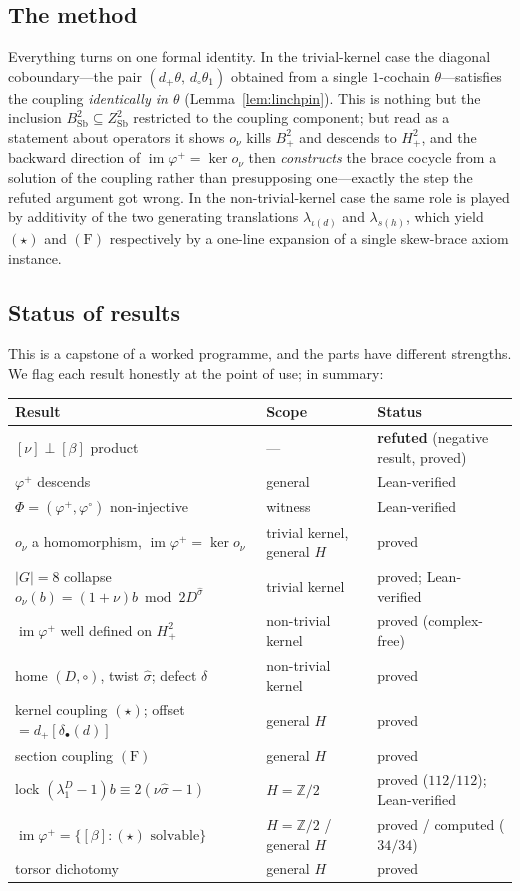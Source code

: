 \documentclass[11pt,reqno]{amsart}
\theoremstyle{plain}
\theoremstyle{definition}
\newcommand{\Sb}{\mathrm{Sb}}
\newcommand{\Z}{\mathbb{Z}}
\newcommand{\im}{\operatorname{im}}
\newcommand{\shat}{\widehat{\sigma}}
\newcommand{\lD}{\lambda^{D}}
\newcommand{\iot}{\iota}
\begin{document}
\subsection*{The method}
Everything turns on one formal identity. In the trivial-kernel case the diagonal
coboundary---the pair $(d_+\theta,\,d_\circ\theta_1)$ obtained from a single $1$-cochain
$\theta$---satisfies the coupling \emph{identically in $\theta$}
(Lemma~\ref{lem:linchpin}). This is nothing but the inclusion
$B^2_{\Sb}\subseteq Z^2_{\Sb}$ restricted to the coupling component; but read as a
statement about operators it shows $o_\nu$ kills $B^2_+$ and descends to $H^2_+$, and the
backward direction of $\im\varphi^{+}=\ker o_\nu$ then \emph{constructs} the brace cocycle
from a solution of the coupling rather than presupposing one---exactly the step the refuted
argument got wrong. In the non-trivial-kernel case the same role is played by additivity of
the two generating translations $\lambda_{\iot(d)}$ and $\lambda_{s(h)}$, which yield
$(\star)$ and $\mathrm{(F)}$ respectively by a one-line expansion of a single skew-brace
axiom instance.

\subsection*{Status of results}
This is a capstone of a worked programme, and the parts have different strengths. We flag
each result honestly at the point of use; in summary:

\begin{center}\small
\begin{tabular}{@{}lll@{}}
\toprule
Result & Scope & Status \\
\midrule
$[\nu]\perp[\beta]$ product & --- & \textbf{refuted} (negative result, proved) \\
$\varphi^{+}$ descends & general & Lean-verified \\
$\Phi=(\varphi^{+},\varphi^{\circ})$ non-injective & witness & Lean-verified \\
$o_\nu$ a homomorphism, $\im\varphi^{+}=\ker o_\nu$ & trivial kernel, general $H$ & proved \\
$|G|=8$ collapse $o_\nu(b)=(1+\nu)b \bmod 2D^{\shat}$ & trivial kernel & proved; Lean-verified \\
$\im\varphi^{+}$ well defined on $H^2_+$ & non-trivial kernel & proved (complex-free) \\
home $(D,\circ)$, twist $\shat$; defect $\delta$ & non-trivial kernel & proved \\
kernel coupling $(\star)$; offset $=d_+[\delta_\bullet(d)]$ & general $H$ & proved \\
section coupling $\mathrm{(F)}$ & general $H$ & proved \\
lock $(\lD_1-1)b\equiv 2(\nu\shat-1)$ & $H=\Z/2$ & proved ($112/112$); Lean-verified \\
$\im\varphi^{+}=\{[\beta]:(\star)\text{ solvable}\}$ & $H=\Z/2$ / general $H$ & proved / computed ($34/34$) \\
torsor dichotomy & general $H$ & proved \\
\bottomrule
\end{tabular}
\end{center}
\end{document}
